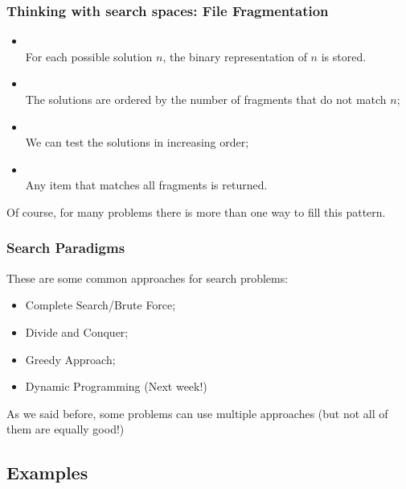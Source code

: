 \documentclass{beamer}
\begin{document}
\begin{frame}
  \frametitle{Thinking with search spaces: File Fragmentation}
  \begin{itemize}
  \item {}\\
    For each possible solution $n$, the binary representation of $n$ is stored.
  \item {}\\
    The solutions are ordered by the number of fragments that do not match $n$;
  \item {}\\
    We can test the solutions in increasing order;
  \item {}\\
    Any item that matches all fragments is returned.
  \end{itemize}  

  \bigskip

  Of course, for many problems there is more than one way to fill this
  pattern.
\end{frame}

\begin{frame}
  \frametitle{Search Paradigms}
  These are some common approaches for search problems:
  
  \begin{itemize}
    \item Complete Search/Brute Force;
    \item Divide and Conquer;
    \item Greedy Approach;
    \item Dynamic Programming (Next week!)
  \end{itemize}

  \bigskip

  As we said before, some problems can use multiple approaches (but
  not all of them are equally good!)
\end{frame}

\subsection{Examples}
\end{document}
